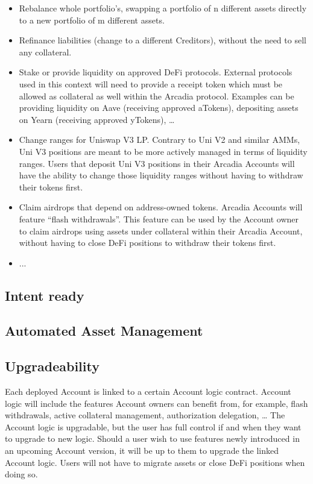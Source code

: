 \documentclass[sigconf,nonacm]{acmart}
\begin{document}
\begin{itemize}
    \item Rebalance whole portfolio's, swapping a portfolio of n different assets directly to a new portfolio of m different assets.
    \item Refinance liabilities (change to a different Creditors), without the need to sell any collateral.
    \item Stake or provide liquidity on approved DeFi protocols.
    External protocols used in this context will need to provide a receipt token which must be allowed as collateral as well within the Arcadia protocol.
    Examples can be providing liquidity on Aave (receiving approved aTokens), depositing assets on Yearn (receiving approved yTokens), …
    \item Change ranges for Uniswap V3 LP. Contrary to Uni V2 and similar AMMs, Uni V3 positions are meant to be more actively managed in terms of liquidity ranges.
    Users that deposit Uni V3 positions in their Arcadia Accounts will have the ability to change those liquidity ranges without having to withdraw their tokens first.
    \item Claim airdrops that depend on address-owned tokens. Arcadia Accounts will feature “flash withdrawals”.
    This feature can be used by the Account owner to claim airdrops using assets under collateral within their Arcadia Account, without having to close DeFi positions to withdraw their tokens first.
    \item ...
\end{itemize}

\subsection{Intent ready}

\subsection{Automated Asset Management}

\subsection{Upgradeability}
Each deployed Account is linked to a certain Account logic contract.
Account logic will include the features Account owners can benefit from, for example, flash withdrawals, active collateral management, authorization delegation, … 
The Account logic is upgradable, but the user has full control if and when they want to upgrade to new logic.
Should a user wish to use features newly introduced in an upcoming Account version, it will be up to them to upgrade the linked Account logic.
Users will not have to migrate assets or close DeFi positions when doing so. 
\end{document}
